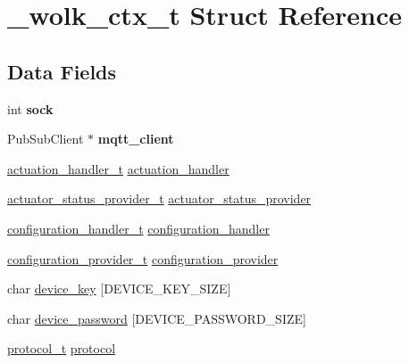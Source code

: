 \hypertarget{struct__wolk__ctx__t}{}\section{\+\_\+wolk\+\_\+ctx\+\_\+t Struct Reference}
\label{struct__wolk__ctx__t}
\subsection*{Data Fields}
\begin{DoxyCompactItemize}
\item 
\mbox{\label{struct__wolk__ctx__t_a2233b692159d4df06fda99457359cd31}} 
int {\bfseries sock}
\item 
\mbox{\label{struct__wolk__ctx__t_aa9463f61f22b652871f33506a24ee4cb}} 
Pub\+Sub\+Client $\ast$ {\bfseries mqtt\+\_\+client}
\item 
\hyperlink{WolkConn_8h_acde87869e807b1774680f3f2b5b04e2f}{actuation\+\_\+handler\+\_\+t} \hyperlink{struct__wolk__ctx__t_ac55ed80718abb1dca3027edda713ca57}{actuation\+\_\+handler}
\item 
\hyperlink{WolkConn_8h_af3e8919a04a293972b64605557287537}{actuator\+\_\+status\+\_\+provider\+\_\+t} \hyperlink{struct__wolk__ctx__t_aadae34ca3e3d99ed0e124ffd610f1edd}{actuator\+\_\+status\+\_\+provider}
\item 
\hyperlink{WolkConn_8h_a6662d0d41546795466cc2b398d8dcb08}{configuration\+\_\+handler\+\_\+t} \hyperlink{struct__wolk__ctx__t_a4d17880aa8086559923d94f678cecfbc}{configuration\+\_\+handler}
\item 
\hyperlink{WolkConn_8h_a64d56254d09f9e452751f32b3c5a39d3}{configuration\+\_\+provider\+\_\+t} \hyperlink{struct__wolk__ctx__t_a4b2c98179054515e4288812f21bff3a4}{configuration\+\_\+provider}
\item 
char \hyperlink{struct__wolk__ctx__t_a52168fce420127bfa577ffea6fce0306}{device\+\_\+key} \mbox{[}D\+E\+V\+I\+C\+E\+\_\+\+K\+E\+Y\+\_\+\+S\+I\+ZE\mbox{]}
\item 
char \hyperlink{struct__wolk__ctx__t_a3a57dc7e7475697302709e722863e736}{device\+\_\+password} \mbox{[}D\+E\+V\+I\+C\+E\+\_\+\+P\+A\+S\+S\+W\+O\+R\+D\+\_\+\+S\+I\+ZE\mbox{]}
\item 
\hyperlink{WolkConn_8h_a91e19fa4fff461493e1a41f7c7aa4e5f}{protocol\+\_\+t} \hyperlink{struct__wolk__ctx__t_ab98629a506ce39393254cf331189dc9a}{protocol}

\end{DoxyCompactItemize}
